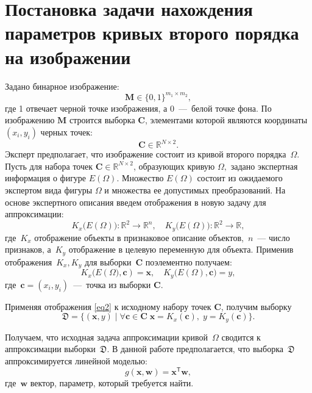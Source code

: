 \documentclass[12pt, twoside]{article}
\numberwithin{equation}{section}
\begin{document}
\section{Постановка задачи нахождения параметров кривых второго порядка на изображении}
Задано бинарное изображение:
$$ \mathbf{M} \in \{0, 1 \}^{m_1\times m_2},$$
где 1 отвечает черной точке изображения, а 0~---~белой точке фона.
По изображению $\mathbf{M}$ строится выборка $\mathbf{C}$, элементами которой являются координаты $(x_i, y_i)$ черных точек: $$\mathbf{C} \in \mathbb{R}^{N \times 2}.$$
Эксперт предполагает, что изображение состоит из кривой второго порядка~$\Omega$.
Пусть для набора точек $\mathbf{C} \in \mathbb{R}^{N \times 2}$, образующих кривую $\Omega,$ задано экспертная информация о фигуре $E(\Omega)$.
Множество $E(\Omega)$ состоит из ожидаемого экспертом вида фигуры $\Omega$ и множества ее допустимых преобразований. На основе экспертного описания введем отображения в новую задачу для аппроксимации:
\begin{equation}\label{eq1}
	K_{x}\bigl(E(\Omega)\bigr): \mathbb{R}^{2} \rightarrow \mathbb{R}^{n}, \quad K_{y}\bigl(E(\Omega)\bigr): \mathbb{R}^{2} \rightarrow \mathbb{R},
\end{equation} 
где~$K_{x}$ отображение объекты в признаковое описание объектов,~$n$~--- число признаков, а~$K_{y}$ отображение в целевую переменную для объекта. Применив отображения~$K_{x},K_{y}$ для выборки~$\mathbf{C}$ поэлементно получаем:
\begin{equation}
\label{eq2}
	K_{x}\bigl(E(\Omega\bigr), \mathbf{c}) = \mathbf{x}, \quad  K_{y}\bigl(E(\Omega), \mathbf{c}\bigr) = y,
\end{equation}
где~$\mathbf{c} = (x_i, y_i)$~---~точка из выборки $\mathbf{C}$.

Применяя отображения \eqref{eq2} к исходному набору точек $\mathbf{C}$, получим выборку 
\begin{equation}
\label{eq4}
    \mathfrak{D} = \{(\mathbf{x}, y) \; | \; \forall \mathbf{c} \in \mathbf{C} \; \mathbf{x} = K_x(\mathbf{c}), \; y = K_y(\mathbf{c}) \}.
\end{equation}

Получаем, что исходная задача аппроксимации кривой~$\Omega$ сводится к аппроксимации выборки~$\mathfrak{D}$. В данной работе предполагается, что выборка~$\mathfrak{D}$ аппроксимируется линейной моделью:
\begin{equation}
	g(\mathbf{x}, \mathbf{w}) = \mathbf{x}^\mathsf{T} \mathbf{w},
\end{equation} 
где~$\mathbf{w}$ вектор, параметр, который требуется найти.
\end{document}
